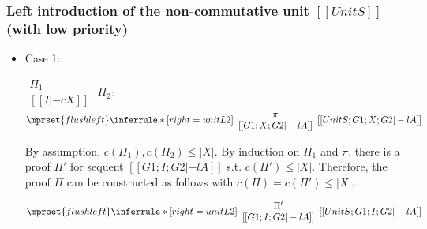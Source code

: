\subsubsection{Left introduction of the non-commutative unit $[[UnitS]]$ (with low priority)}
\begin{itemize}
\item Case 1:
      \begin{center}
        \scriptsize
        \begin{math}
          \begin{array}{c}
            \Pi_1 \\
            {[[I |-c X]]}
          \end{array}
        \end{math}
        \qquad\qquad
        $\Pi_2$:
        \begin{math}
          $$\mprset{flushleft}
          \inferrule* [right={\tiny unitL2}] {
            {
              \begin{array}{c}
                \pi \\
                {[[G1; X; G2 |-l A]]}
              \end{array}
            }
          }{[[UnitS; G1; X; G2 |-l A]]}
        \end{math}
      \end{center}
      By assumption, $c(\Pi_1),c(\Pi_2)\leq |X|$. By induction on $\Pi_1$
      and $\pi$, there is a proof $\Pi'$ for sequent $[[G1; I; G2 |-l A]]$
      s.t. $c(\Pi') \leq |X|$. Therefore, the proof $\Pi$ can be
      constructed as follows with $c(\Pi) = c(\Pi') \leq |X|$.
      \begin{center}
        \scriptsize
        \begin{math}
          $$\mprset{flushleft}
          \inferrule* [right={\tiny unitL2}] {
            {
              \begin{array}{c}
                \Pi' \\
                {[[G1; I; G2 |-l A]]}
              \end{array}
            }
          }{[[UnitS; G1; I; G2 |-l A]]}
        \end{math}
      \end{center}


\end{itemize}
